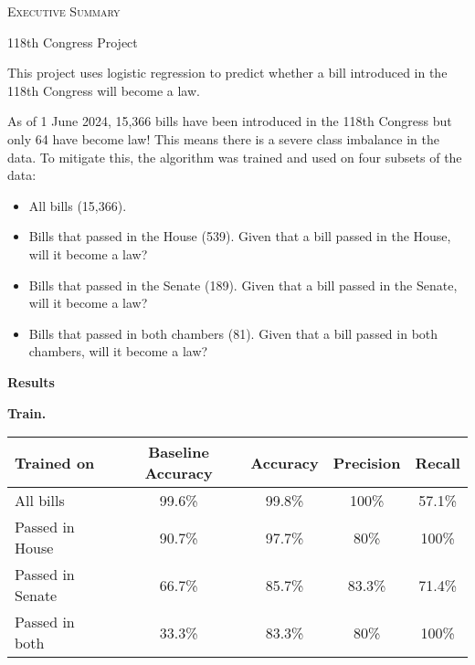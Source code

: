 \documentclass[12pt]%
{article}
\begin{document}
\begin{center}
{\Large \textsc{Executive Summary}}

\vspace{0.5pc}
118th Congress Project

\end{center}

\vspace{1.5pc}
This project uses logistic regression to predict whether a bill introduced in the 118th Congress will become a law.  

\vspace{0.5pc}
As of 1 June 2024, 15,366 bills have been introduced in the 118th Congress but only 64 have become law!  This means there is a severe class imbalance in the data.  To mitigate this, the algorithm was trained and used on four subsets of the data:
\begin{itemize}
\itemsep0em
\item All bills (15,366).
\item Bills that passed in the House (539).  Given that a bill passed in the House, will it become a law?
\item Bills that passed in the Senate (189).  Given that a bill passed in the Senate, will it become a law?
\item Bills that passed in both chambers (81).  Given that a bill passed in both chambers, will it become a law?
\end{itemize}

\vspace{0.5pc}
\begin{center}
{\large\textbf{Results}}
\end{center}  

\textbf{Train.}
\begin{center}
\renewcommand{\arraystretch}{1.5}
\begin{tabular}{| l | c | c | c | c |}
\hline
\textbf{Trained on} & \textbf{Baseline Accuracy} & \textbf{Accuracy} & \textbf{Precision} & \textbf{Recall} \\
\hline
All bills & 99.6\% & 99.8\% & 100\% & 57.1\% \\
\hline
Passed in House & 90.7\% & 97.7\% & 80\% & 100\% \\
\hline
Passed in Senate & 66.7\% & 85.7\% & 83.3\% & 71.4\% \\
\hline 
Passed in both & 33.3\% & 83.3\% & 80\% & 100\% \\
\hline
\end{tabular}
\end{center}
\end{document}
